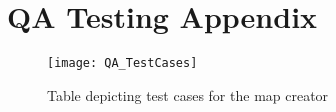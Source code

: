 \newpage
\section*{QA Testing Appendix} %


\begin{figure}[h2] 
\centering \texttt{[image: QA\_TestCases]}
\caption{Table depicting test cases for the map creator} 
\end{figure}
